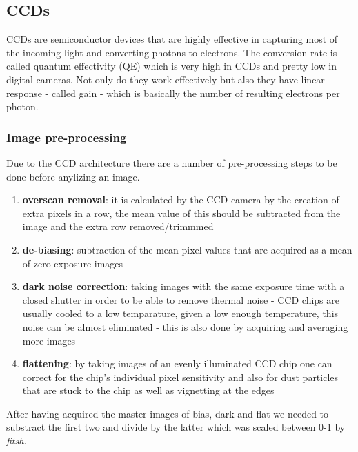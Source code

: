 \documentclass[a4paper,12pt]{article}
\begin{document}
\subsection{CCDs}

\par CCDs are semiconductor devices that are highly effective in capturing most of the
incoming light and converting photons to electrons. The conversion rate is called
quantum effectivity (QE) which is very high in CCDs and pretty low in digital cameras.
Not only do they work effectively but also they have linear response - called gain - which
is basically the number of resulting electrons per photon.

\subsubsection{Image pre-processing}

\par Due to the CCD architecture there are a number of pre-processing steps
to be done before anylizing an image.

\begin{enumerate}
    \item \textbf{overscan removal}: it is calculated by the CCD camera by the creation of
          extra pixels in a row, the mean value of this should be subtracted from the image and the extra row
          removed/trimmmed
    \item \textbf{de-biasing}: subtraction of the mean pixel values that are acquired as a mean of zero exposure
          images
    \item \textbf{dark noise correction}: taking images with the same exposure time with a closed shutter in order
          to be able to remove thermal noise - CCD chips are usually cooled to a low temparature, given a low enough temperature, this noise
          can be almost eliminated - this is also done by acquiring and averaging more images
    \item \textbf{flattening}: by taking images of an evenly illuminated CCD chip one can correct for the chip's individual pixel sensitivity
          and also for dust particles that are stuck to the chip as well as vignetting at the edges
\end{enumerate}


\par After having acquired the master images of bias, dark and flat we needed to substract the first two and
divide by the latter which was scaled between 0-1 by \textit{fitsh}.
\end{document}
